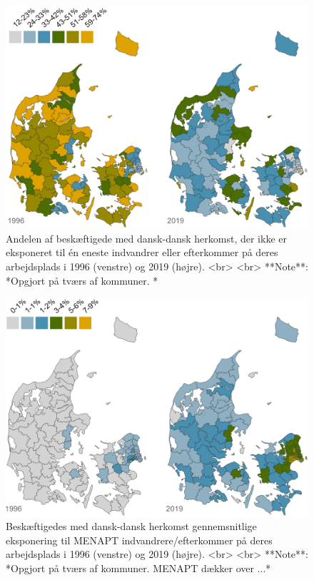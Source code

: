 \documentclass[
]{book}
\begin{document}
\begin{figure}
\includegraphics[width=1\linewidth]{images/Figur_4_2} \caption{Andelen af beskæftigede med dansk-dansk herkomst, der ikke er eksponeret til én eneste indvandrer eller efterkommer på deres arbejdsplads i 1996 (venstre) og 2019 (højre). <br> <br> **Note**: *Opgjort på tværs af kommuner. *}\label{fig:fig-4-2}
\end{figure}

\begin{figure}
\includegraphics[width=1\linewidth]{images/Figur_4_3} \caption{Beskæftigedes med dansk-dansk herkomst gennemsnitlige eksponering til MENAPT indvandrere/efterkommer på deres arbejdsplads i 1996 (venstre) og 2019 (højre). <br> <br> **Note**: *Opgjort på tværs af kommuner. MENAPT dækker over ...*}\label{fig:fig-4-3}
\end{figure}
\end{document}
